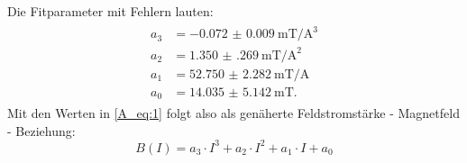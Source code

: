 Die Fitparameter mit Fehlern lauten:
\begin{align}
\begin{split}
  a_3 &= \SI{-0.072(9)}{\milli\tesla\per\cubic\ampere}\\
  a_2 &= \SI{1.350(269)}{\milli\tesla\per\square\ampere}\\
  a_1 &= \SI{52.750(2282)}{\milli\tesla\per\ampere}\\
  a_0 &= \SI{14.035(5142)}{\milli\tesla}.
  \label{A_eq:1}
\end{split}
\end{align}
Mit den Werten in \eqref{A_eq:1} folgt also als genäherte Feldstromstärke - Magnetfeld
- Beziehung:
\begin{equation}
  B(I) = a_3 \cdot I^3 + a_2 \cdot I^2 + a_1 \cdot I + a_0
\end{equation}



\newpage
\nocite{*}
\printbibliography
